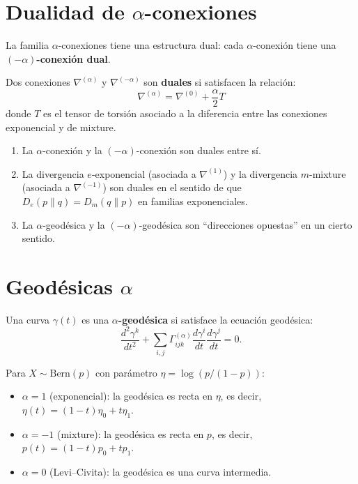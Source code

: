 \section{Dualidad de $\alpha$-conexiones}

La familia $\alpha$-conexiones tiene una estructura dual: cada $\alpha$-conexión tiene una \textbf{$(-\alpha)$-conexión dual}.

\begin{definition}[Dualidad]
	Dos conexiones $\nabla^{(\alpha)}$ y $\nabla^{(-\alpha)}$ son \textbf{duales} si satisfacen la relación:
	\[
	\nabla^{(\alpha)} = \nabla^{(0)} + \frac{\alpha}{2} T
	\]
	donde $T$ es el tensor de torsión asociado a la diferencia entre las conexiones exponencial y de mixture.
\end{definition}

\begin{theorem}
	\begin{enumerate}
		\item La $\alpha$-conexión y la $(-\alpha)$-conexión son duales entre sí.
		\item La divergencia $e$-exponencial (asociada a $\nabla^{(1)}$) y la divergencia $m$-mixture (asociada a $\nabla^{(-1)}$) son duales en el sentido de que $D_e(p \| q) = D_m(q \| p)$ en familias exponenciales.
		\item La $\alpha$-geodésica y la $(-\alpha)$-geodésica son ``direcciones opuestas'' en un cierto sentido.
	\end{enumerate}
\end{theorem}

\section{Geodésicas $\alpha$}

\begin{definition}
	Una curva $\gamma(t)$ es una \textbf{$\alpha$-geodésica} si satisface la ecuación geodésica:
	\[
	\frac{d^2\gamma^k}{dt^2} + \sum_{i,j} \Gamma^{(\alpha)}_{ijk}\frac{d\gamma^i}{dt}\frac{d\gamma^j}{dt} = 0.
	\]
\end{definition}

\begin{example}
	Para $X \sim \mathrm{Bern}(p)$ con parámetro $\eta = \log(p/(1-p))$:
	\begin{itemize}
		\item $\alpha = 1$ (exponencial): la geodésica es recta en $\eta$, es decir, $\eta(t) = (1-t)\eta_0 + t\eta_1$.
		\item $\alpha = -1$ (mixture): la geodésica es recta en $p$, es decir, $p(t) = (1-t)p_0 + tp_1$.
		\item $\alpha = 0$ (Levi--Civita): la geodésica es una curva intermedia.
	\end{itemize}
\end{example}

